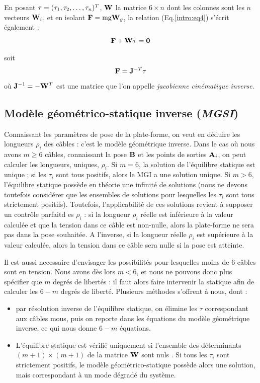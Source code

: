En posant ${\bf \tau} = (\tau_1, \tau_2, \dots, \tau_n)^T$, ${\bf W}$ la 
matrice $6 \times n$ dont les colonnes sont les $n$ vecteurs ${\bf W}_i$, et 
en isolant $\mathcal {\bf F} = \hbox{mg} {\bf W}_g$, la relation (Eq.\ref{intro:eq4}) s'écrit 
également :
\begin{equation}
\mathcal {\bf F} + {\bf W} \tau = {\bf 0}
\label{intro:eq5a}
\end{equation}

soit  
\begin{equation}
\mathcal {\bf F} = {\bf J}^{-T} {\bf \tau}
\label{intro:eq5b}
\end{equation}
où ${\bf J}^{-1} = - {\bf W}^T$ est une matrice que l'on appelle {\it 
jacobienne cin\'ematique inverse}.

\subsection{Modèle géométrico-statique inverse ({\it MGSI})} 
\label{chap0-1-3}

Connaissant les paramètres de pose de la plate-forme, on veut en déduire les 
longueurs $\rho_i$ des câbles : c'est le modèle géométrique inverse. 
Dans le cas où nous avons $m \geq 6$ câbles, connaissant la pose ${\bf B}$ et 
les points de sorties ${\bf A}_i$, on peut calculer les longueurs, uniques, 
$\rho_i$. Si $m = 6$, la solution de l'équilibre statique est unique ; si les 
$\tau_i$ sont tous positifs, alors le MGI a une solution unique. 
Si $m > 6$, l'\'equilibre statique possède en théorie une infinité de solutions 
(nous ne devons toutefois consid\'erer que les ensembles de solutions pour 
lesquelles les $\tau_i$ sont tous strictement positifs). Toutefois, 
l'applicabilit\'e de ces solutions revient \`a supposer un contr\^ole parfaitd 
es $\rho_i$ : si la longueur $\rho_i$ r\'eelle est inf\'erieure \`a la valeur 
calcul\'ee et que la tension dans ce c\^able est non-nulle, alors la 
plate-forme ne sera pas dans la pose souhait\'ee. A l'inverse, si la 
longueur r\'eelle $\rho_i$ est sup\'erieure \`a la valeur calcul\'ee, alors la 
tension dans ce c\^able sera nulle si la pose est atteinte.

Il est aussi necessaire d'envisager les possibilit\'es pour lesquelles moins de 
$6$ c\^ables sont en tension. Nous avons d\`es lors $m < 6$, et nous ne pouvons 
donc plus sp\'ecifier que $m$ degr\'es de libert\'es : il faut alors faire 
intervenir la statique afin de calculer les $6-m$ degr\'es de libert\'e. 
Plusieurs m\'ethodes s'offrent \`a nous, dont :
\begin{itemize}
 \item par r\'esolution inverse de l'\'equilibre statique, on \'elimine les 
$\tau$ correspondant aux c\^ables mous, puis on reporte dans les \'equations du 
mod\`ele g\'eom\'etrique inverse, ce qui nous donne $6-m$ \'equations.
\item L'équilibre statique est vérifié 
uniquement si l'ensemble des déterminants $(m+1) \times (m+1)$ de la matrice 
${\bf W}$ sont nuls \cite{carricato_merlet2013}. Si tous les $\tau_i$ sont 
strictement positifs, le modèle géométrico-statique possède alors une solution, 
mais correspondant à un mode dégradé du système.
\end{itemize}


